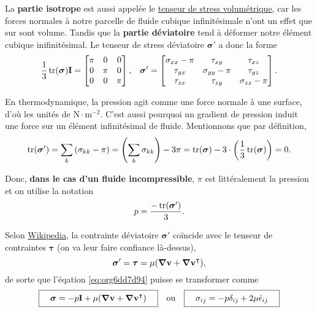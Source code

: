 \documentclass[10pt]{article}
\numberwithin{equation}{section}
\newcommand{\vv}{\vb{v}}
\newcommand{\tall}{\vphantom{pA^{x^x}_p}}
\begin{document}
La \textbf{partie isotrope} est aussi appelée le \href{https://en.wikipedia.org/wiki/Cauchy\_stress\_tensor}{tenseur de stress volumétrique}, car les forces normales à notre parcelle de fluide cubique infinitésimale n'ont un effet que sur sont volume.
Tandis que la \textbf{partie déviatoire} tend à déformer notre élément cubique inifinitésimal.
Le tenseur de stress déviatoire \(\boldsymbol{\sigma}'\) a donc la forme
\begin{align}
   &&\frac{1}{3} \trace(\boldsymbol{\sigma})\mathbf{I} =    \begin{bmatrix}
     \pi & 0 & 0 \\
     0 & \pi & 0 \\
     0 & 0 & \pi \\
   \end{bmatrix},
   &&\boldsymbol{\sigma}' =    \begin{bmatrix}
     \sigma_{xx}-\pi & \tau_{xy} & \tau_{xz} \\
     \tau_{yx} & \sigma_{yy}-\pi & \tau_{yz} \\
     \tau_{zx} & \tau_{zy} & \sigma_{zz}-\pi \\
   \end{bmatrix}.&&
\end{align}


En thermodynamique, la pression agit comme une force normale à une surface, d'où les unités de \(\mathrm{N}\cdot\mathrm{m}^{-2}\).
C'est aussi pourquoi un gradient de pression induit une force sur un élément infinitésimal de fluide.
Mentionnons que par définition,
\begin{equation}
\label{eq:orgbff6776}
   \trace(\boldsymbol{\sigma}') = \sum_k \qty(\sigma_{kk} - \pi) = \qty(\sum_k \sigma_{kk}) - 3\pi = \trace(\boldsymbol{\sigma}) - 3\cdot\qty(\frac{1}{3}\trace(\boldsymbol{\sigma})) = 0.
\end{equation}


Donc, \textbf{dans le cas d'un fluide incompressible}, \(\pi\) est littéralement la pression et on utilise la notation
\begin{equation}
   p = \frac{-\trace(\boldsymbol{\sigma}')}{3}.
\end{equation}

Selon \href{https://en.wikipedia.org/wiki/Newtonian\_fluid\#Newtonian\_law\_of\_viscosity}{Wikipedia}, la contrainte déviatoire \(\boldsymbol{\sigma}'\) coïncide avec le tenseur de contraintes \(\boldsymbol{\tau}\) (on va leur faire confiance là-dessus), 
\begin{equation}
   \boldsymbol{\sigma}' = \boldsymbol{\tau} = \mu \qty(\gradient{\vv} + \gradient{\vv}^\intercal),
\end{equation}
de sorte que l'éqation \ref{eq:org6dd7d94} puisse se transformer comme
\begin{align}
\label{eq:orgdb9461a}
   &&\boxed{\quad\tall\boldsymbol{\sigma} = -p \mathbf{I} + \mu \qty(\gradient{\vv} + \gradient{\vv}^\intercal)\quad}
   &&\text{ou}
   &&\boxed{\quad\sigma_{ij} = -p\delta_{ij} + 2\mu\dot{\epsilon}_{ij}\quad\tall}&&
\end{align}
\end{document}
